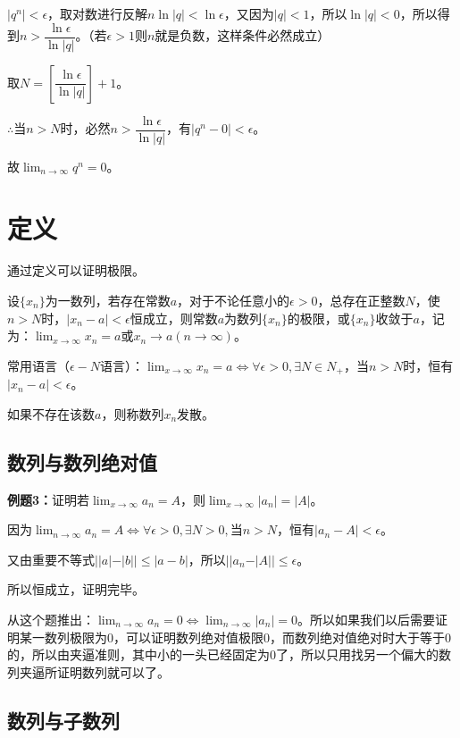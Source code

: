 \documentclass[UTF8]{ctexart}
\begin{document}
$\vert q^n\vert<\epsilon$，取对数进行反解$n\ln\vert q\vert<\ln\epsilon$，又因为$\vert q\vert<1$，所以$\ln\vert q\vert<0$，所以得到$n>\dfrac{\ln\epsilon}{\ln\vert q\vert}$。（若$\epsilon>1$则$n$就是负数，这样条件必然成立）

取$N=\left[\dfrac{\ln\epsilon}{\ln\vert q\vert}\right]+1$。

$\therefore$当$n>N$时，必然$n>\dfrac{\ln\epsilon}{\ln\vert q\vert}$，有$\vert q^n-0\vert<\epsilon$。

故$\lim_{n\to\infty}q^n=0$。

\section{定义}

通过定义可以证明极限。

设$\{x_n\}$为一数列，若存在常数$a$，对于不论任意小的$\epsilon>0$，总存在正整数$N$，使$n>N$时，$\vert x_n-a\vert<\epsilon$恒成立，则常数$a$为数列$\{x_n\}$的极限，或$\{x_n\}$收敛于$a$，记为：$\lim_{x\to\infty}x_n=a$或$x_n\to a(n\to\infty)$。

常用语言（$\epsilon-N$语言）：$\lim_{x\to\infty}x_n=a\Leftrightarrow\forall\epsilon>0,\exists N\in N_+$，当$n>N$时，恒有$\vert x_n-a\vert<\epsilon$。

如果不存在该数$a$，则称数列$x_n$发散。

\subsection{数列与数列绝对值}

\textbf{例题3：}证明若$\lim_{x\to\infty}a_n=A$，则$\lim_{x\to\infty}\vert a_n\vert=\vert A\vert$。

因为$\lim_{n\to\infty}a_n=A\Leftrightarrow\forall\epsilon>0,\exists N>0,\text{当}n>N$，恒有$\vert a_n-A\vert<\epsilon$。

又由重要不等式$\vert\vert a\vert-\vert b\vert\vert\leqslant\vert a-b\vert$，所以$\vert\vert a_n-\vert A\vert\vert\leqslant\epsilon$。

所以恒成立，证明完毕。

从这个题推出：$\lim_{n\to\infty}a_n=0\Leftrightarrow\lim_{n\to\infty}\vert a_n\vert=0$。所以如果我们以后需要证明某一数列极限为0，可以证明数列绝对值极限0，而数列绝对值绝对时大于等于0的，所以由夹逼准则，其中小的一头已经固定为0了，所以只用找另一个偏大的数列夹逼所证明数列就可以了。

\subsection{数列与子数列}
\end{document}
